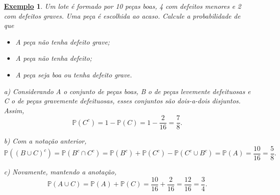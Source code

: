 \documentclass{article}
\newtheorem{example}{\underline{Exemplo}}
\begin{document}
\begin{example}
  Um lote é formado por 10 peças boas, 4 com defeitos menores e 2 com defeitos graves. Uma peça é escolhida ao acaso. Calcule a probabilidade de que 
 \begin{itemize}
   \item[a)] A peça não tenha defeito grave;
   \item[b)] A peça não tenha defeito;
   \item[c)] A peça seja boa ou tenha defeito grave.
 \end{itemize}
  a) Considerando A o conjunto de peças boas, B o de peças levemente defeituosas e C o de peças gravemente defeituosas, esses conjuntos são dois-a-dois disjuntos. Assim, 
    \[
      \mathbb{P}(C^{c}) = 1 - \mathbb{P}(C) = 1 - \frac{2}{16} = \frac{7}{8}.
    \]
    
  b) Com a notação anterior, 
    \[
      \mathbb{P}((B\cup C)^{c}) = \mathbb{P}(B^{c}\cap C^{c}) = \mathbb{P}(B^{c}) + \mathbb{P}(C^{c}) - \mathbb{P}(C^{c}\cup B^{c}) = \mathbb{P}(A) = \frac{10}{16} = \frac{5}{8}.
    \]

  c) Novamente, mantendo a anotação, 
    \[
      \mathbb{P}(A\cup C) = \mathbb{P}(A) + \mathbb{P}(C) = \frac{10}{16} + \frac{2}{16} = \frac{12}{16} = \frac{3}{4}.
    \]
\end{example}
\end{document}
